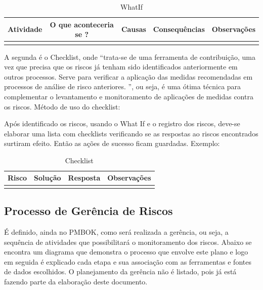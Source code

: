 \begin{apendicesenv}
\begin{table}[htp]
    \centering
    \caption{WhatIf}
    \label{my-label}
    \begin{tabular}{|l|l|l|l|l|}
    \hline
    \multicolumn{1}{|c|}{\textbf{Atividade}} & \multicolumn{1}{c|}{\textbf{O que aconteceria se ?}} & \multicolumn{1}{c|}{\textbf{Causas}} & \textbf{Consequências} & \textbf{Observações} \\ \hline
     &  &  &  &  \\ \hline
    \end{tabular}
\end{table}

A segunda é o Checklist, onde “trata-se de uma ferramenta de contribuição, uma vez que precisa que os riscos já tenham sido identificados anteriormente em outros processos. Serve para verificar a aplicação das medidas recomendadas em processos de análise de risco anteriores. ”\cite{qualidadesimples}, ou seja, é uma ótima técnica para complementar o levantamento e monitoramento de aplicações de medidas contra os riscos. Método de uso do checklist:

Após identificado os riscos, usando o What If e o registro dos riscos, deve-se elaborar uma lista com checklists verificando se as respostas ao riscos encontrados surtiram efeito. Então as ações de sucesso ficam guardadas. Exemplo:

\begin{table}[htp]
    \centering
    \caption{Checklist}
    \label{my-label}
    \begin{tabular}{|l|l|l|l|}
    \hline
    \multicolumn{1}{|c|}{\textbf{Risco}} & \multicolumn{1}{c|}{\textbf{Solução}} & \multicolumn{1}{c|}{\textbf{Resposta}} & \multicolumn{1}{c|}{\textbf{Observações}} \\ \hline
     &  &  &  \\ \hline
    \end{tabular}
\end{table}

\subsection{Processo de Gerência de Riscos}
É definido, ainda no PMBOK, como será realizada a gerência, ou seja, a sequência de atividades que possibilitará o monitoramento dos riscos. Abaixo se encontra um diagrama que demonstra o processo que envolve este plano e logo em seguida é explicado cada etapa e sua associação com as ferramentas e fontes de dados escolhidos. O planejamento da gerência não é listado, pois já está fazendo parte da elaboração deste documento.


\end{apendicesenv}
